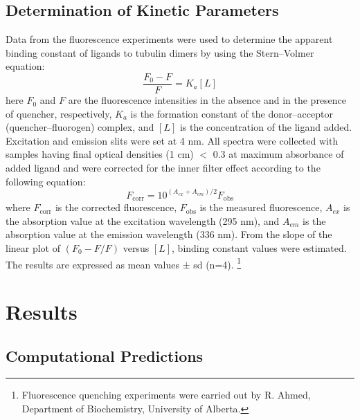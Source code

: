 \documentclass[11pt]{report}
\begin{document}
\subsection{Determination of Kinetic Parameters}
Data from the fluorescence experiments were used to determine the apparent binding constant of ligands to tubulin dimers by using the Stern--Volmer equation:
\begin{equation}
\label{eq:stern-volmer}
\dfrac{F_0-F}{F}=K_a[L]
\end{equation}
here $F_0$ and $F$ are the fluorescence intensities in the absence and in the presence of quencher, respectively, $K_a$ is the formation constant of the donor--acceptor (quencher--fluorogen) complex, and $[L]$ is the concentration of the ligand added. Excitation and emission slits were set at 4 nm. All spectra were collected with samples having final optical densities (1 cm) $<$ 0.3 at maximum absorbance of added ligand and were corrected for the inner filter effect according to the following equation:
\begin{equation}
\label{eq:correction}
F_{\text{corr}} = 10^{(A_{ex} + A_{em})/2} F_{\text{obs}}
\end{equation} 
where $F_{\text{corr}}$ is the corrected fluorescence, $F_{\text{obs}}$ is the measured fluorescence, $A_{ex}$ is the absorption value at the excitation wavelength (295 nm), and $A_{em}$ is the absorption value at the emission wavelength (336 nm). From the slope of the linear plot of $({F_0-F}/{F})$ versus $[L]$, binding constant values were estimated. The results are expressed as mean values $\pm$ \gls{sd} (n=4). \footnote{Fluorescence quenching experiments were
carried out by R. Ahmed, Department of Biochemistry, University of Alberta.}


\section{Results}

\subsection{Computational Predictions}
\end{document}
